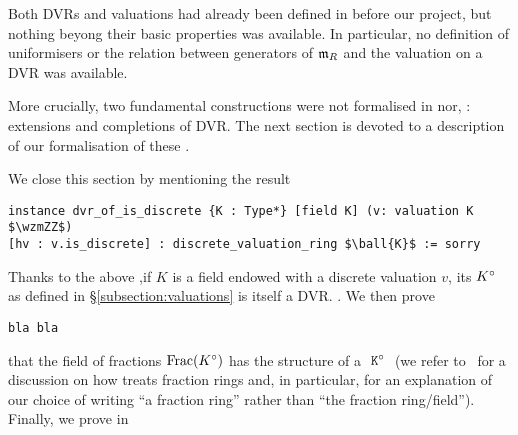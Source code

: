 \documentclass[sigplan,10pt,anonymous,review]{acmart}
\begin{document}
Both DVRs and valuations had already been defined in  before our project, but nothing beyong their basic properties was available. In particular, no definition of uniformisers or the relation between generators of $\mathfrak{m}_{R}$ and the valuation on a DVR was available. 

More crucially, two fundamental constructions were not formalised in \mathlib nor, : extensions and completions of DVR. The next section is devoted to a description of our formalisation of these .

We close this section by mentioning the result
\begin{lstlisting}
instance dvr_of_is_discrete {K : Type*} [field K] (v: valuation K $\wzmZZ$)
[hv : v.is_discrete] : discrete_valuation_ring $\ball{K}$ := sorry
\end{lstlisting}
Thanks to the above ,if $K$ is a field endowed with a discrete valuation $v$, its  ${K}^\circ$ as defined in \S\ref{subsection:valuations} is itself a DVR. . We then prove 
\begin{lstlisting}
bla bla
\end{lstlisting}
that the field of fractions $\operatorname{Frac}({K}^\circ)$ has the structure of a $\mathtt{\ {K}^\circ\ }$ \href{https://leanprover-community.github.io/mathlib_docs/ring_theory/localization/fraction_ring.html#fraction_ring}{\extlink} (we refer to~\cite[\S4.5]{BaaDahNarNuc22} for a discussion on how \mathlib treats fraction rings and, in particular, for an explanation of our choice of writing ``a fraction ring'' rather than ``the fraction ring/field''). Finally, we prove in
\begin{lstlisting}
\end{lstlisting}
\end{document}
